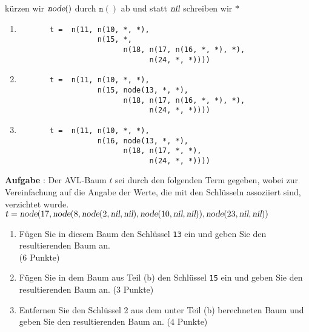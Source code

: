 \documentclass{article}
\newcounter{aufgabe}
\newcommand{\exercise}{\vspace*{0.2cm}
\stepcounter{aufgabe}

\noindent
\textbf{Aufgabe \arabic{aufgabe}}: }
\begin{document}
k\"urzen wir $\textsl{node}()$ durch $\mathtt{n}()$ ab und statt $\textsl{nil}$ schreiben wir $\mathtt{*}$
\begin{enumerate}
\item \begin{verbatim}
       t =  n(11, n(10, *, *),
                  n(15, *, 
                        n(18, n(17, n(16, *, *), *), 
                              n(24, *, *))))
       \end{verbatim}
\item \begin{verbatim}
       t =  n(11, n(10, *, *),
                  n(15, node(13, *, *),
                        n(18, n(17, n(16, *, *), *), 
                              n(24, *, *))))
      \end{verbatim}
\item \begin{verbatim}
       t =  n(11, n(10, *, *),
                  n(16, node(13, *, *),
                        n(18, n(17, *, *), 
                              n(24, *, *))))
      \end{verbatim}
\end{enumerate}
\vspace{0.3cm}

\exercise
 Der AVL-Baum $t$ sei durch den folgenden Term gegeben,
wobei zur Vereinfachung auf die Angabe der Werte, die mit den Schl\"usseln
assoziiert sind, verzichtet wurde.
\\[0.2cm]
\hspace*{1.3cm}
$t = \textsl{node}(17, 
           \textsl{node}(8, 
               \textsl{node}(2, \textsl{nil}, \textsl{nil}),
               \textsl{node}(10, \textsl{nil}, \textsl{nil})), 
           \textsl{node}(23,\textsl{nil},\textsl{nil}))$
\begin{enumerate}
\item F\"ugen Sie  in diesem Baum den Schl\"ussel \texttt{13} ein und geben Sie den
      resultierenden Baum an.   \\[0.2cm]
      \hspace*{\fill} (6 Punkte)
\item F\"ugen Sie in dem Baum aus Teil (b) den Schl\"ussel \texttt{15} ein und geben Sie den
      resultierenden Baum an.
      \hspace*{\fill} (3 Punkte)
\item Entfernen Sie den Schl\"ussel 2 aus dem unter Teil (b) berechneten Baum und geben Sie
      den resultierenden Baum an.
      \hspace*{\fill} (4 Punkte)
\end{enumerate}
\end{document}
